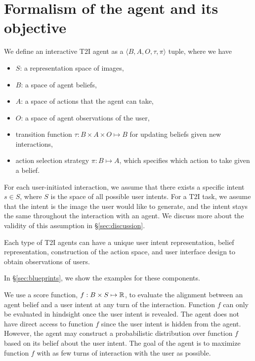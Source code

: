 \section{Formalism of the agent and its objective} 

\label{ssec:objective}

We define an interactive T2I agent as a $\langle B, A, O, \tau, \pi\rangle$ tuple, where we have %

\begin{itemize}
    \item $S$: a representation space of images, %
    \item $B$: a space of agent beliefs, %
    \item $A$: a space of actions that the agent can take,
    \item $O$: a space of agent observations of the user,
    \item transition function $\tau: B\times A \times O\mapsto B$ for updating beliefs given new interactions,
    \item action selection strategy $\pi: B \mapsto A$, which specifies which action to take given a belief.
\end{itemize}

For each user-initiated interaction, we assume that there exists a specific intent $s\in S$, where $S$ is the space of all possible user intents. For a T2I task, we assume that the intent is the image the user would like to generate, and the intent stays the same throughout the interaction with an agent. We discuss more about the validity of this assumption in \S\ref{sec:discussion}.

Each type of T2I agents can have a unique user intent representation, belief representation, construction of the action space, and user interface design to obtain observations of users. %

In \S\ref{sec:blueprints}, we show the examples for these components.

We use a score function, $f: B\times S\mapsto \mathbb{R}$, to evaluate the alignment between an agent belief and a user intent at any turn of the interaction. Function $f$ can only be evaluated in hindsight once the user intent is revealed. The agent does not have direct access to function $f$ since the user intent is hidden from the agent. However, the agent may construct a probabilistic distribution over function $f$ based on its belief about the user intent. The goal of the agent is to maximize function $f$ with as few turns of interaction with the user as possible. 




